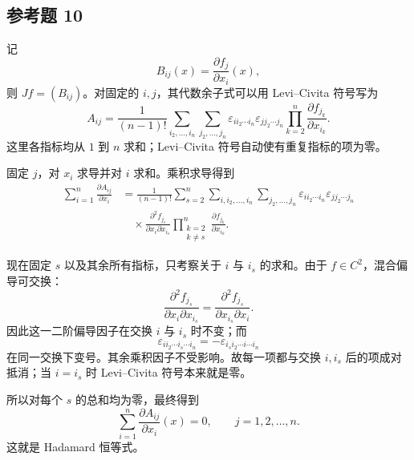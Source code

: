 \subsection*{参考题 10}
\begin{xsolution}
记
\[
  B_{ij}(x)=\frac{\partial f_j}{\partial x_i}(x),
\]
则 $Jf=(B_{ij})$。对固定的 $i,j$，其代数余子式可以用 Levi--Civita 符号写为
\[
  A_{ij}
  =\frac1{(n-1)!}
  \sum_{i_2,\ldots,i_n}
  \sum_{j_2,\ldots,j_n}
  \varepsilon_{i i_2\cdots i_n}
  \varepsilon_{j j_2\cdots j_n}
  \prod_{k=2}^n
  \frac{\partial f_{j_k}}{\partial x_{i_k}}.
\]
这里各指标均从 $1$ 到 $n$ 求和；Levi--Civita 符号自动使有重复指标的项为零。

固定 $j$，对 $x_i$ 求导并对 $i$ 求和。乘积求导得到
\begin{align*}
  \sum_{i=1}^n\frac{\partial A_{ij}}{\partial x_i}
  &=\frac1{(n-1)!}
  \sum_{s=2}^n
  \sum_{i,i_2,\ldots,i_n}
  \sum_{j_2,\ldots,j_n}
  \varepsilon_{i i_2\cdots i_n}
  \varepsilon_{j j_2\cdots j_n}\\
  &\quad\times
  \frac{\partial^2 f_{j_s}}
       {\partial x_i\partial x_{i_s}}
  \prod_{\substack{k=2\\k\ne s}}^n
  \frac{\partial f_{j_k}}{\partial x_{i_k}}.
\end{align*}

现在固定 $s$ 以及其余所有指标，只考察关于 $i$ 与 $i_s$ 的求和。由于 $f\in C^2$，混合偏导可交换：
\[
  \frac{\partial^2 f_{j_s}}
       {\partial x_i\partial x_{i_s}}
  =
  \frac{\partial^2 f_{j_s}}
       {\partial x_{i_s}\partial x_i}.
\]
因此这一二阶偏导因子在交换 $i$ 与 $i_s$ 时不变；而
\[
  \varepsilon_{i i_2\cdots i_s\cdots i_n}
  =-
  \varepsilon_{i_s i_2\cdots i\cdots i_n}
\]
在同一交换下变号。其余乘积因子不受影响。故每一项都与交换 $i,i_s$ 后的项成对抵消；当 $i=i_s$ 时 Levi--Civita 符号本来就是零。

所以对每个 $s$ 的总和均为零，最终得到
\[
  \boxed{
  \sum_{i=1}^n
  \frac{\partial A_{ij}}{\partial x_i}(x)=0,
  \qquad j=1,2,\ldots,n}.
\]
这就是 Hadamard 恒等式。
\end{xsolution}
